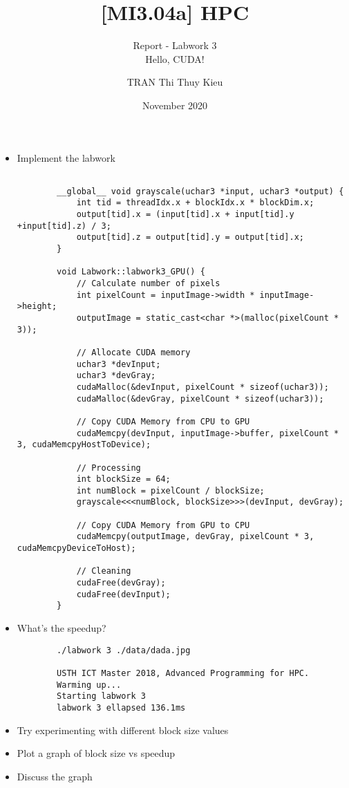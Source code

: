 \documentclass[10pt, a4paper]{article}
\title{[MI3.04a] HPC}
\subtitle{Report - Labwork 3 \\ Hello, CUDA!}
\author{TRAN Thi Thuy Kieu}
\date{November 2020}
\begin{document}
\maketitle



\begin{itemize}
    \item Implement the labwork
    \begin{verbatim}
        
        __global__ void grayscale(uchar3 *input, uchar3 *output) { 
            int tid = threadIdx.x + blockIdx.x * blockDim.x; 
            output[tid].x = (input[tid].x + input[tid].y +input[tid].z) / 3; 
            output[tid].z = output[tid].y = output[tid].x;
        }
        
        void Labwork::labwork3_GPU() {
            // Calculate number of pixels
            int pixelCount = inputImage->width * inputImage->height;
            outputImage = static_cast<char *>(malloc(pixelCount * 3));
        
            // Allocate CUDA memory  
            uchar3 *devInput;
            uchar3 *devGray;
            cudaMalloc(&devInput, pixelCount * sizeof(uchar3));
            cudaMalloc(&devGray, pixelCount * sizeof(uchar3));  
        
            // Copy CUDA Memory from CPU to GPU
            cudaMemcpy(devInput, inputImage->buffer, pixelCount * 3, cudaMemcpyHostToDevice);
        
            // Processing
            int blockSize = 64;
            int numBlock = pixelCount / blockSize;
            grayscale<<<numBlock, blockSize>>>(devInput, devGray);
        
            // Copy CUDA Memory from GPU to CPU
            cudaMemcpy(outputImage, devGray, pixelCount * 3, cudaMemcpyDeviceToHost);
        
            // Cleaning
            cudaFree(devGray);
            cudaFree(devInput);
        }
    \end{verbatim}
    
    
    \item What’s the speedup?
    \begin{verbatim}
        ./labwork 3 ./data/dada.jpg
        
        USTH ICT Master 2018, Advanced Programming for HPC.
        Warming up...
        Starting labwork 3
        labwork 3 ellapsed 136.1ms
    \end{verbatim}
    
    \item Try experimenting with different block size values
    
    \item Plot a graph of block size vs speedup
    \item Discuss the graph
\end{itemize}



\begin{verbatim}
    
\end{verbatim}
\end{document}
